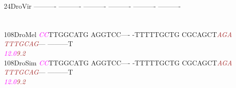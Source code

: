 \documentclass[11pt,twoside,reqno,a4paper]{article}
\begin{document}
{24\hspace*{2\charwidth}DroVir	----------	----------	----------	----------	----------	----------	\\
\hspace*{4\charwidth}\hspace*{7\charwidth}\hspace*{1\charwidth}\hspace*{1\charwidth}\hspace*{1\charwidth}\hspace*{1\charwidth}\hspace*{1\charwidth}\hspace*{1\charwidth}\\
\\
108\hspace*{1\charwidth}DroMel	\textit{\textcolor{magenta}{C}}\textit{\textcolor{magenta}{C}}TTGGCATG	AGGTCC----	-TTTTTGCTG	CGCAGCT\textit{\textcolor{brown}{A}}\textit{\textcolor{brown}{G}}\textit{\textcolor{brown}{A}}	\textit{\textcolor{brown}{T}}\textit{\textcolor{brown}{T}}\textit{\textcolor{brown}{T}}\textit{\textcolor{brown}{G}}\textit{\textcolor{brown}{C}}\textit{\textcolor{brown}{A}}\textit{\textcolor{brown}{G}}---	---------T	\\
\hspace*{4\charwidth}\hspace*{7\charwidth}\hspace*{0\charwidth}\textit{\textcolor{magenta}{12.0}}\hspace*{1\charwidth}\hspace*{1\charwidth}\hspace*{1\charwidth}\hspace*{33\charwidth}\textit{\textcolor{brown}{9.2}}\hspace*{1\charwidth}\hspace*{1\charwidth}\hspace*{1\charwidth}\\
108\hspace*{1\charwidth}DroSim	\textit{\textcolor{magenta}{C}}\textit{\textcolor{magenta}{C}}TTGGCATG	AGGTCC----	-TTTTTGCTG	CGCAGCT\textit{\textcolor{brown}{A}}\textit{\textcolor{brown}{G}}\textit{\textcolor{brown}{A}}	\textit{\textcolor{brown}{T}}\textit{\textcolor{brown}{T}}\textit{\textcolor{brown}{T}}\textit{\textcolor{brown}{G}}\textit{\textcolor{brown}{C}}\textit{\textcolor{brown}{A}}\textit{\textcolor{brown}{G}}---	---------T	\\
\hspace*{4\charwidth}\hspace*{7\charwidth}\hspace*{0\charwidth}\textit{\textcolor{magenta}{12.0}}\hspace*{1\charwidth}\hspace*{1\charwidth}\hspace*{1\charwidth}\hspace*{33\charwidth}\textit{\textcolor{brown}{9.2}}\hspace*{1\charwidth}\hspace*{1\charwidth}\hspace*{1\charwidth}\\
}
\end{document}
